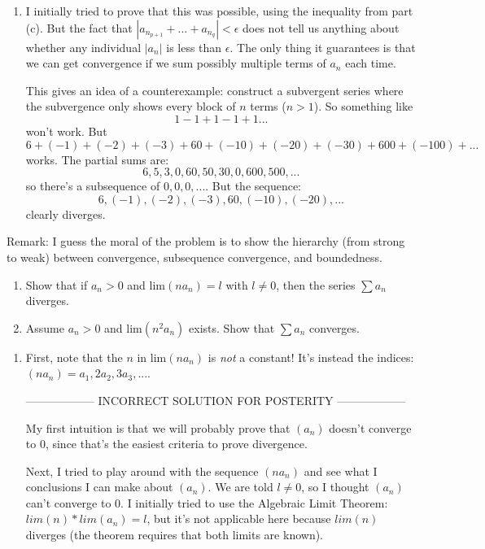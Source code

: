 \documentclass{oxmathproblems}
\begin{document}
\begin{questions}
\begin{solution}
\begin{enumerate}[label=(\alph*)]
    \item I initially tried to prove that this was possible, using the inequality from part (c). But the fact that $|a_{n_{p+1}} + ... + a_{n_{q}}| < \epsilon$ does not tell
    us anything about whether any individual $|a_{n}|$ is less than $\epsilon$. The only thing it guarantees is that we can get convergence if we sum possibly multiple
    terms of $a_{n}$ each time.

    This gives an idea of a counterexample: construct a subvergent series where the subvergence only shows every block of $n$ terms ($n > 1$). So something like 
    \[1-1+1-1+1...\]
    won't work. But
    \[6 + (-1) + (-2) + (-3) + 60 + (-10) + (-20) + (-30) + 600 + (-100) + ...\] 
    works. The partial sums are: \[6, 5, 3, 0, 60, 50, 30, 0, 600, 500, ...\]
    so there's a subsequence of $0, 0, 0, ...$. But the sequence: \[6, (-1), (-2), (-3), 60, (-10), (-20), ...\] clearly diverges.
  \end{enumerate}

  Remark:
  I guess the moral of the problem is to show the hierarchy (from strong to weak) between convergence, subsequence convergence, and boundedness.
\end{solution}

\miquestion 
  \begin{enumerate}[label=(\alph*)]
    \item Show that if $a_{n} > 0$ and lim$(na_{n}) = l$ with $l \neq 0$, then the series $\sum a_{n}$ diverges.
    \item Assume $a_{n} > 0$ and lim$(n^{2}a_{n})$ exists. Show that $\sum a_{n}$ converges.
  \end{enumerate}

\begin{solution}
  \begin{enumerate}[label=(\alph*)]
    \item First, note that the $n$ in lim$(na_{n})$ is \textit{not} a constant! It's instead the indices: $(na_{n}) = a_{1}, 2a_{2}, 3a_{3}, ...$.
    
    ------------------ INCORRECT SOLUTION FOR POSTERITY ------------------
  
    My first intuition is that we will probably prove that $(a_{n})$ doesn't converge to 0, since that's the easiest criteria to prove divergence.

    Next, I tried to play around with the sequence $(na_{n})$ and see what I conclusions I can make about $(a_{n})$. We are told $l \neq 0$, so I thought
    $(a_{n})$ can't converge to 0. I initially tried to use the Algebraic Limit Theorem: $lim (n) * lim (a_{n}) = l$, but it's not applicable here because
    $lim (n)$ diverges (the theorem requires that both limits are known).


\end{enumerate}
\end{solution}
\end{questions}
\end{document}
